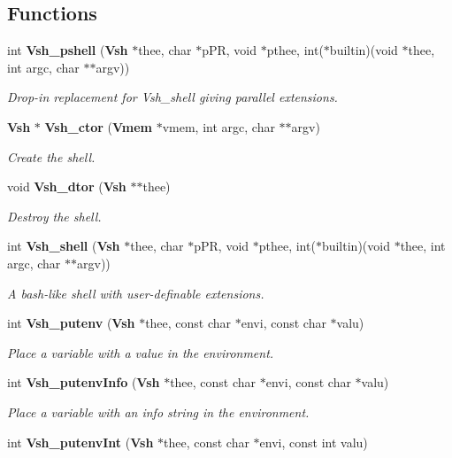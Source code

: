 \subsection*{Functions}
\begin{DoxyCompactItemize}
\item 
int {\bf Vsh\+\_\+pshell} ({\bf Vsh} $\ast$thee, char $\ast$p\+P\+R, void $\ast$pthee, int($\ast$builtin)(void $\ast$thee, int argc, char $\ast$$\ast$argv))
\begin{DoxyCompactList}\small\item\em Drop-\/in replacement for Vsh\+\_\+shell giving parallel extensions. \end{DoxyCompactList}\item 
{\bf Vsh} $\ast$ {\bf Vsh\+\_\+ctor} ({\bf Vmem} $\ast$vmem, int argc, char $\ast$$\ast$argv)
\begin{DoxyCompactList}\small\item\em Create the shell. \end{DoxyCompactList}\item 
void {\bf Vsh\+\_\+dtor} ({\bf Vsh} $\ast$$\ast$thee)
\begin{DoxyCompactList}\small\item\em Destroy the shell. \end{DoxyCompactList}\item 
int {\bf Vsh\+\_\+shell} ({\bf Vsh} $\ast$thee, char $\ast$p\+P\+R, void $\ast$pthee, int($\ast$builtin)(void $\ast$thee, int argc, char $\ast$$\ast$argv))
\begin{DoxyCompactList}\small\item\em A bash-\/like shell with user-\/definable extensions. \end{DoxyCompactList}\item 
int {\bf Vsh\+\_\+putenv} ({\bf Vsh} $\ast$thee, const char $\ast$envi, const char $\ast$valu)
\begin{DoxyCompactList}\small\item\em Place a variable with a value in the environment. \end{DoxyCompactList}\item 
int {\bf Vsh\+\_\+putenv\+Info} ({\bf Vsh} $\ast$thee, const char $\ast$envi, const char $\ast$valu)
\begin{DoxyCompactList}\small\item\em Place a variable with an info string in the environment. \end{DoxyCompactList}\item 
int {\bf Vsh\+\_\+putenv\+Int} ({\bf Vsh} $\ast$thee, const char $\ast$envi, const int valu)

\end{DoxyCompactItemize}
